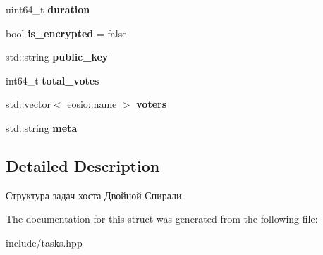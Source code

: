 \begin{DoxyCompactItemize}
\item 
\mbox{\label{structtasks_a95f88b37716d025c81cfcf9091b7b1e9}} 
uint64\+\_\+t {\bfseries duration}
\item 
\mbox{\label{structtasks_a054b40e6f71e3a6e8ee5b060f110980f}} 
bool {\bfseries is\+\_\+encrypted} = false
\item 
\mbox{\label{structtasks_a0fd14a56e1f0f01da069aed7a67fff26}} 
std\+::string {\bfseries public\+\_\+key}
\item 
\mbox{\label{structtasks_a40d534d86b521f66775ed1b2d391ea38}} 
int64\+\_\+t {\bfseries total\+\_\+votes}
\item 
\mbox{\label{structtasks_a16b3de55e07255e8252fd85e26688dd3}} 
std\+::vector$<$ eosio\+::name $>$ {\bfseries voters}
\item 
\mbox{\label{structtasks_a5f7ccf26e6ac1b678d8cd6807631a19e}} 
std\+::string {\bfseries meta}
\end{DoxyCompactItemize}


\subsection{Detailed Description}
Структура задач хоста Двойной Спирали. 

The documentation for this struct was generated from the following file\+:\begin{DoxyCompactItemize}
\item 
include/tasks.\+hpp\end{DoxyCompactItemize}
